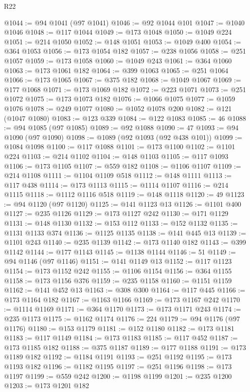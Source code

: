 \begin{lexlean}{R22}
\begin{coremodule}
@1044 := @94 @1041 (@97 @1041)
@1046 := @92 @1044 @101
@1047 := @1040 @1046
@1048 := @117 @1044
@1049 := @173 @1048
@1050 := @1049 @224
@1051 := @214 @1050
@1052 := @148 @1051
@1053 := @1049 @400
@1054 := @364 @1053
@1056 := @173 @1054 @182
@1057 := @238 @1056
@1058 := @251 @1057
@1059 := @173 @1058
@1060 := @1049 @243
@1061 := @364 @1060
@1063 := @173 @1061 @182
@1064 := @399 @1063
@1065 := @251 @1064
@1066 := @173 @1065
@1067 := @375 @182
@1068 := @1049 @1067
@1069 := @177 @1068
@1071 := @173 @1069 @182
@1072 := @223 @1071
@1073 := @251 @1072
@1075 := @173 @1073 @182
@1076 := @1066 @1075
@1077 := @1059 @1076
@1078 := @249 @1077
@1080 := @1052 @1078 @200
@1082 := @121 (@1047 @1080)
@1083 := @123 @339
@1084 := @122 @1083
@1085 := 46
@1088 := @94 @1085 (@97 @1085)
@1089 := @92 @1088
@1090 := 47
@1093 := @94 @1090 (@97 @1090)
@1098 := @1089 (@92 @1093 (@92 @438 @101))
@1099 := @1084 @1098
@1100 := @117 @1088
@1101 := @173 @1100
@1102 := @1101 @224
@1103 := @214 @1102
@1104 := @148 @1103
@1105 := @117 @1093
@1106 := @173 @1105
@1107 := @559 @182
@1108 := @1106 @1107
@1109 := @214 @1108
@1111 := @1104 @1109 @518
@1112 := @148 @1111
@1113 := @117 @438
@1114 := @173 @1113
@1115 := @1114 @1107
@1116 := @214 @1115
@1118 := @1112 @1116 @518
@1119 := @148 @1118
@1120 := 49
@1123 := @94 @1120 (@97 @1120)
@1125 := @141 @1123 @13
@1126 := @1101 @400
@1127 := @235 @1126
@1129 := @173 @1127 @242
@1130 := @171 @1129
@1131 := @148 @1130
@1132 := @153 @112
@1133 := @152 @1132
@1135 := @1131 @1133 @374
@1136 := @1125 @1135
@1138 := @141 @445 @13
@1139 := @1101 @243
@1140 := @235 @1139
@1142 := @173 @1140 @182
@1143 := @399 @1142
@1144 := @177 @1143
@1145 := @1138 @1144
@1146 := 51
@1149 := @94 @1146 (@97 @1146)
@1151 := @141 @1149 @13
@1152 := @117 @1123
@1154 := @173 @1152 @242
@1155 := @1106 @1154
@1156 := @364 @1155
@1158 := @173 @1156 @376
@1159 := @235 @1158
@1160 := @1151 @1159
@1162 := @141 @452 @13
@1163 := @308 @300
@1164 := @117 @445
@1166 := @173 @1164 @182
@1167 := @1163 @1166
@1169 := @173 @1167 @242
@1170 := @1114 @1169
@1171 := @364 @1170
@1173 := @173 @1171 @243
@1174 := @235 @1173
@1175 := @1162 @1174
@1176 := 224
@1179 := @94 @1176 (@97 @1176)
@1180 := @153 @1179
@1181 := @152 @1180
@1182 := @173 @1181
@1183 := @117 @1149
@1184 := @173 @1183
@1185 := @117 @452
@1187 := @173 @1185 @182
@1188 := @375 @1187
@1189 := @177 @1188
@1191 := @173 @1189 @182
@1192 := @1184 @1191
@1193 := @251 @1192
@1195 := @173 @1193 @182
@1196 := @1182 @1195
@1197 := @251 @1196
@1198 := @173 @1197
@1199 := @559 @242
@1200 := @1198 @1199
@1201 := @235 @1200
@1203 := @173 @1201 @182

\end{coremodule}
\end{lexlean}

